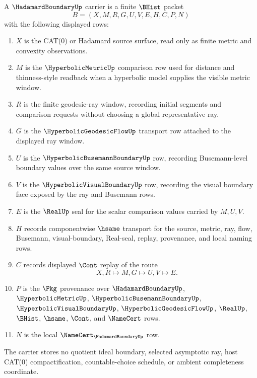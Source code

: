 \begin{definition}
\label{def:hadamard-boundary-carrier}
A $\HadamardBoundaryUp$ carrier is a finite $\BHist$ packet
$$
B=(X,M,R,G,U,V,E,H,C,P,N)
$$
with the following displayed rows:
\begin{enumerate}
\item $X$ is the CAT(0) or Hadamard source surface, read only as finite metric and convexity observations.
\item $M$ is the $\HyperbolicMetricUp$ comparison row used for distance and thinness-style readback when a hyperbolic model supplies the visible metric window.
\item $R$ is the finite geodesic-ray window, recording initial segments and comparison requests without choosing a global representative ray.
\item $G$ is the $\HyperbolicGeodesicFlowUp$ transport row attached to the displayed ray window.
\item $U$ is the $\HyperbolicBusemannBoundaryUp$ row, recording Busemann-level boundary values over the same source window.
\item $V$ is the $\HyperbolicVisualBoundaryUp$ row, recording the visual boundary face exposed by the ray and Busemann rows.
\item $E$ is the $\RealUp$ seal for the scalar comparison values carried by $M,U,V$.
\item $H$ records componentwise $\hsame$ transport for the source, metric, ray, flow, Busemann, visual-boundary, Real-seal, replay, provenance, and local naming rows.
\item $C$ records displayed $\Cont$ replay of the route
$$
X,R \longmapsto M,G \longmapsto U,V \longmapsto E .
$$
\item $P$ is the $\Pkg$ provenance over $\HadamardBoundaryUp$, $\HyperbolicMetricUp$, $\HyperbolicBusemannBoundaryUp$, $\HyperbolicVisualBoundaryUp$, $\HyperbolicGeodesicFlowUp$, $\RealUp$, $\BHist$, $\hsame$, $\Cont$, and $\NameCert$ rows.
\item $N$ is the local $\NameCert_{\HadamardBoundaryUp}$ row.
\end{enumerate}
The carrier stores no quotient ideal boundary, selected asymptotic ray, host CAT(0) compactification, countable-choice schedule, or ambient completeness coordinate.
\end{definition}

